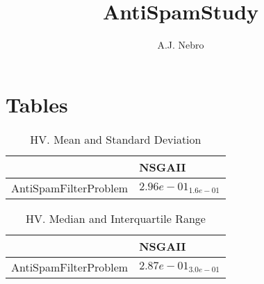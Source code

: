\documentclass{article}
\title{AntiSpamStudy}
\author{A.J. Nebro}
\begin{document}
\maketitle
\section{Tables}

\begin{table}
\caption{HV. Mean and Standard Deviation}
\label{table: HV}
\centering
\begin{scriptsize}
\begin{tabular}{ll}
\hline &  NSGAII\\
\hline 
AntiSpamFilterProblem & \cellcolor{gray95}$  2.96e-01_{ 1.6e-01}$ \\
\hline
\end{tabular}
\end{scriptsize}
\end{table}

\begin{table}
\caption{HV. Median and Interquartile Range}
\label{table: HV}
\centering
\begin{scriptsize}
\begin{tabular}{ll}
\hline &  NSGAII\\
\hline 
AntiSpamFilterProblem & \cellcolor{gray95}$  2.87e-01_{ 3.0e-01}$ \\
\hline
\end{tabular}
\end{scriptsize}
\end{table}
\end{document}
